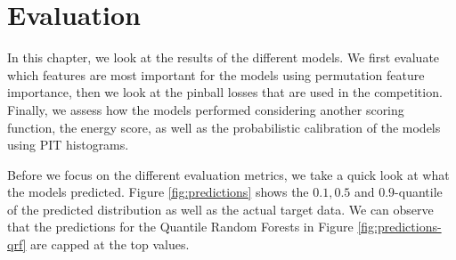 \chapter{Evaluation}
\label{ch:evaluation}

In this chapter, we look at the results of the different models. 
We first evaluate which features are most important for the models using 
permutation feature importance, then we look at the pinball losses 
that are used in the competition. Finally, we assess how the models performed 
considering another scoring function, the energy score, as well as the probabilistic calibration 
of the models using PIT histograms.

Before we focus on the different evaluation metrics, 
we take a quick look at what the models predicted. 
Figure \ref{fig:predictions} shows the \(0.1, 0.5\) and \(0.9\)-quantile 
of the predicted distribution as well as the actual target data.
We can observe that the predictions for the Quantile Random Forests in Figure \ref{fig:predictions-qrf} are 
capped at the top values. 

